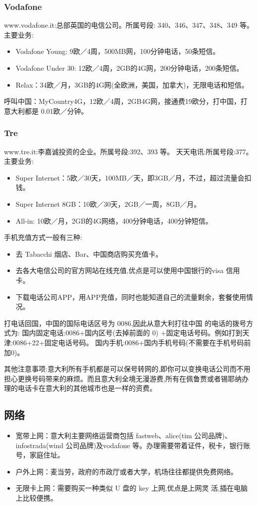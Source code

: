 \subsubsection{Vodafone}
www.vodafone.it:总部英国的电信公司。所属号段: 340、346、347、348、349 等。 
主要业务:
\begin{itemize}
\item Vodafone Young:  9欧／4周，500MB网，100分钟电话，50条短信。
\item Vodafone Under 30:  12欧／4周，2GB的4G网，200分钟电话，200条短信。
\item Relax：34欧／月，3GB的4G网(全欧洲，美国，加拿大)，无限电话和短信。
\end{itemize}
呼叫中国：MyCountry4G，12欧／4周，2GB4G网，接通费19欧分，打中国，打意大利都是 0.01欧／分钟。



\subsubsection{Tre}
www.tre.it:李嘉诚投资的企业。所属号段:392、393 等。 天天电讯:所属号段:377。 
主要业务:
\begin{itemize}
\item  Super Internet：5欧／30天，100MB／天，即3GB／月，不过，超过流量会扣钱。
\item  Super Internet 8GB：10欧／30天，2GB／一周，8GB／月。
\item  All-in: 10欧／月，2GB的4G网络，400分钟电话，400分钟短信。
\end{itemize}


手机充值方式一般有三种:
\begin{itemize}
\item 去 Tabacchi 烟店、Bar、中国商店购买充值卡。 
\item 去各大电信公司的官方网站在线充值,优点是可以使用中国银行的visa 信用卡。 
\item 下载电话公司APP，用APP充值，同时也能知道自己的流量剩余，套餐使用情况。
\end{itemize}
打电话回国，中国的国际电话区号为 0086,因此从意大利打往中国	的电话的拨号方式为: 国内固定电话:0086+国内区号(去掉前面的 0) +固定电话号码。例如打到天津:0086+22+固定电话号码。 国内手机:0086+国内手机号码(不需要在手机号码前加0)。

 其他注意事项:意大利所有手机都是可以保号转网的,即你可以变换电话公司而不用担心更换号码带来的麻烦。而且意大利全境无漫游费,所有在佩鲁贾或者锡耶纳办理的电话卡在意大利的其他城市也是一样的资费。 
\subsection{网络}

\begin{itemize}
\item 宽带上网：意大利主要网络运营商包括 fastweb、alice(tim 公司品牌)、infostrada(wind 公司品牌)及vodafone 等。办理需要带着证件，税卡，银行账号，家庭住址。
\item 户外上网：麦当劳，政府的市政厅或者大学，机场往往都提供免费网络。
\item 无限卡上网：需要购买一种类似 U 盘的 key 上网,优点是上网灵 活,插在电脑上比较便携。
\end{itemize}
